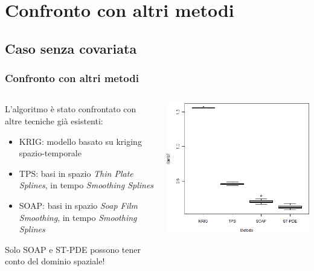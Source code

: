 \documentclass[landscape,9pt]{beamer}                           %
\begin{document}
\section{Confronto con altri metodi}
\subsection{Caso senza covariata}
\begin{frame}
\frametitle{Confronto con altri metodi}
\begin{columns}
	\begin{column}{0.6\textwidth}
	L'algoritmo è stato confrontato con altre tecniche già esistenti:
	\begin{itemize}
	\item KRIG: modello basato su kriging spazio-temporale
	\item TPS: basi in spazio \textit{Thin Plate Splines}, in tempo \textit{Smoothing Splines}
	\item SOAP: basi in spazio \textit{Soap Film Smoothing}, in tempo \textit{Smoothing Splines} 
	\end{itemize}
	Solo SOAP e ST-PDE possono tener conto del dominio spaziale!
	\end{column}
	\begin{column}{0.4\textwidth}
	\begin{flushright}
		\includegraphics[width=1\textwidth]{Immagini/Confronto_metodi.png}
	\end{flushright}		
	\end{column}
\end{columns}
\end{frame}
\end{document}
